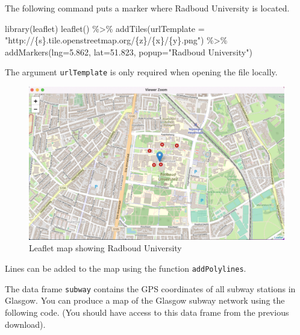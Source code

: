 \documentclass[
]{book}
\newenvironment{Shaded}{\begin{snugshade}}{\end{snugshade}}
\newcommand{\AttributeTok}[1]{\textcolor[rgb]{0.77,0.63,0.00}{#1}}
\newcommand{\FloatTok}[1]{\textcolor[rgb]{0.00,0.00,0.81}{#1}}
\newcommand{\FunctionTok}[1]{\textcolor[rgb]{0.00,0.00,0.00}{#1}}
\newcommand{\NormalTok}[1]{#1}
\newcommand{\SpecialCharTok}[1]{\textcolor[rgb]{0.00,0.00,0.00}{#1}}
\newcommand{\StringTok}[1]{\textcolor[rgb]{0.31,0.60,0.02}{#1}}
\begin{document}
The following command puts a marker where Radboud University is located.

\begin{Shaded}
\begin{Highlighting}[]
\FunctionTok{library}\NormalTok{(leaflet)}
\FunctionTok{leaflet}\NormalTok{() }\SpecialCharTok{\%\textgreater{}\%}
   \FunctionTok{addTiles}\NormalTok{(}\AttributeTok{urlTemplate =} \StringTok{"http://\{s\}.tile.openstreetmap.org/\{z\}/\{x\}/\{y\}.png"}\NormalTok{) }\SpecialCharTok{\%\textgreater{}\%} 
   \FunctionTok{addMarkers}\NormalTok{(}\AttributeTok{lng=}\FloatTok{5.862}\NormalTok{, }\AttributeTok{lat=}\FloatTok{51.823}\NormalTok{, }\AttributeTok{popup=}\StringTok{"Radboud University"}\NormalTok{)}
\end{Highlighting}
\end{Shaded}

The argument \texttt{urlTemplate} is only required when opening the file locally.

\begin{figure}
\centering
\includegraphics{leaflet1.png}
\caption{Leaflet map showing Radboud University}
\end{figure}

Lines can be added to the map using the function \texttt{addPolylines}.

The data frame \texttt{subway} contains the GPS coordinates of all subway stations in Glasgow. You can produce a map of the Glasgow subway network using the following code. (You should have access to this data frame from the previous download).
\end{document}
